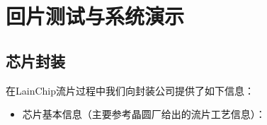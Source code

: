 
\chapter{回片测试与系统演示}\label{chap:09-test-and-show}

\section{芯片封装}\label{sec:09-test-and-show-001}

在LainChip流片过程中我们向封装公司提供了如下信息：

\begin{itemize}
\item
  芯片基本信息（主要参考晶圆厂给出的流片工艺信息）：


\end{itemize}

